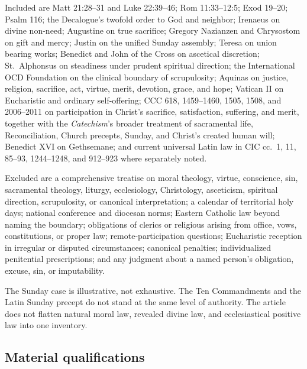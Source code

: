 Included are Matt 21:28--31 and Luke 22:39--46; Rom 11:33--12:5; Exod 19--20; Psalm 116; the Decalogue's twofold order to God and neighbor; Irenaeus on divine non-need; Augustine on true sacrifice; Gregory Nazianzen and Chrysostom on gift and mercy; Justin on the unified Sunday assembly; Teresa on union bearing works; Benedict and John of the Cross on ascetical discretion; St.~Alphonsus on steadiness under prudent spiritual direction; the International OCD Foundation on the clinical boundary of scrupulosity; Aquinas on justice, religion, sacrifice, act, virtue, merit, devotion, grace, and hope; Vatican II on Eucharistic and ordinary self-offering; CCC 618, 1459--1460, 1505, 1508, and 2006--2011 on participation in Christ's sacrifice, satisfaction, suffering, and merit, together with the \emph{Catechism}'s broader treatment of sacramental life, Reconciliation, Church precepts, Sunday, and Christ's created human will; Benedict XVI on Gethsemane; and current universal Latin law in CIC cc.~1, 11, 85--93, 1244--1248, and 912--923 where separately noted.

Excluded are a comprehensive treatise on moral theology, virtue, conscience, sin, sacramental theology, liturgy, ecclesiology, Christology, asceticism, spiritual direction, scrupulosity, or canonical interpretation; a calendar of territorial holy days; national conference and diocesan norms; Eastern Catholic law beyond naming the boundary; obligations of clerics or religious arising from office, vows, constitutions, or proper law; remote-participation questions; Eucharistic reception in irregular or disputed circumstances; canonical penalties; individualized penitential prescriptions; and any judgment about a named person's obligation, excuse, sin, or imputability.

The Sunday case is illustrative, not exhaustive. The Ten Commandments and the Latin Sunday precept do not stand at the same level of authority. The article does not flatten natural moral law, revealed divine law, and ecclesiastical positive law into one inventory.

\subsection{Material qualifications}

